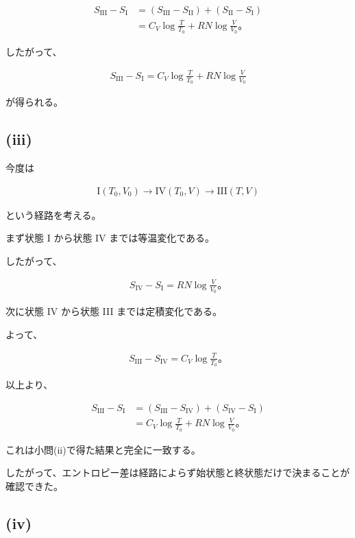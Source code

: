 \documentclass[platex,dvipdfmx,a4paper]{jsarticle}
\begin{document}
\begin{align*}
S_{\mathrm{III}}-S_{\mathrm{I}}
&=
(S_{\mathrm{III}}-S_{\mathrm{II}})
+(S_{\mathrm{II}}-S_{\mathrm{I}}) \\
&=
C_V\log\frac{T}{T_0}
+
RN\log\frac{V}{V_0}。
\end{align*}

したがって、

\begin{align*}
S_{\mathrm{III}}-S_{\mathrm{I}}
=
C_V\log\frac{T}{T_0}
+
RN\log\frac{V}{V_0}
\end{align*}

が得られる。

\subsection{(iii)}

今度は

\begin{align*}
\mathrm{I}(T_0,V_0)
\rightarrow
\mathrm{IV}(T_0,V)
\rightarrow
\mathrm{III}(T,V)
\end{align*}

という経路を考える。

まず状態 I から状態 IV までは等温変化である。

したがって、

\begin{align*}
S_{\mathrm{IV}}-S_{\mathrm{I}}
=
RN\log\frac{V}{V_0}。
\end{align*}

次に状態 IV から状態 III までは定積変化である。

よって、

\begin{align*}
S_{\mathrm{III}}-S_{\mathrm{IV}}
=
C_V\log\frac{T}{T_0}。
\end{align*}

以上より、

\begin{align*}
S_{\mathrm{III}}-S_{\mathrm{I}}
&=
(S_{\mathrm{III}}-S_{\mathrm{IV}})
+(S_{\mathrm{IV}}-S_{\mathrm{I}}) \\
&=
C_V\log\frac{T}{T_0}
+
RN\log\frac{V}{V_0}。
\end{align*}

これは小問(ii)で得た結果と完全に一致する。

したがって、エントロピー差は経路によらず始状態と終状態だけで決まることが確認できた。

\subsection{(iv)}
\end{document}
